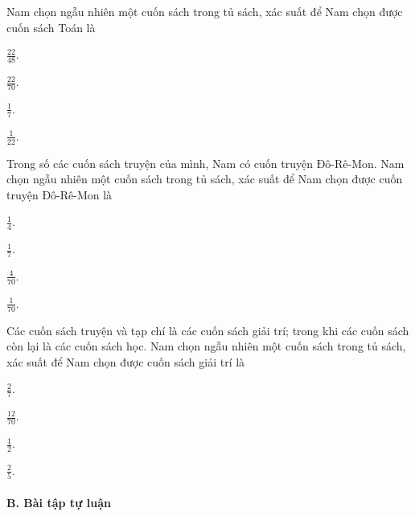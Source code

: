 \documentclass[%
    fontsize=12pt,%
    chapterprefix=false,%
    open=right,%
    twoside=false,%
    numbers=noenddot,%
    headings=optiontohead,%
    final,%
    DIV=15,%
    parskip=half %
]{scrbook}
\begin{document}
\begin{tracnghiem}
\item Nam chọn ngẫu nhiên một cuốn sách trong tủ sách, xác suất để Nam chọn được cuốn sách Toán là
\begin{options}
  \item $ \frac{22}{48} $.
  \item $ \frac{22}{70} $.
  \item $ \frac{1}{7} $.
  \item $ \frac{1}{22} $.
\end{options}

\item Trong số các cuốn sách truyện của mình, Nam có cuốn truyện Đô-Rê-Mon. Nam chọn ngẫu nhiên một cuốn sách trong tủ sách, xác suất để Nam chọn được cuốn truyện Đô-Rê-Mon là
\begin{options}
  \item $ \frac{1}{4} $.
  \item $ \frac{1}{7} $.
  \item $ \frac{4}{70} $.
  \item $ \frac{1}{70} $.
\end{options}

\item Các cuốn sách truyện và tạp chí là các cuốn sách giải trí; trong khi các cuốn sách còn lại là các cuốn sách học. Nam chọn ngẫu nhiên một cuốn sách trong tủ sách, xác suất để Nam chọn được cuốn sách giải trí là
\begin{options}
  \item $ \frac{2}{7} $.
  \item $ \frac{12}{70} $.
  \item $ \frac{1}{2} $.
  \item $ \frac{2}{5} $.
\end{options}

\end{tracnghiem}

\paragraph{B. Bài tập tự luận}
\end{document}
